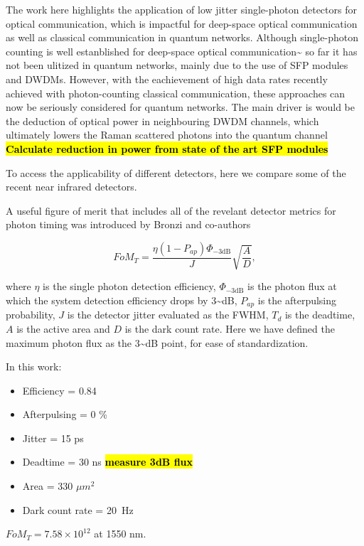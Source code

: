 \documentclass{optica-article}
\begin{document}
The work here highlights the application of low jitter single-photon detectors for optical communication, which is impactful for deep-space optical communication as well as classical communication in quantum networks. Although single-photon counting is well estanblished for deep-space optical communication\textasciitilde{}\cite{Laser lunar, DSOC} so far it has not been ulitized in quantum networks, mainly due to the use of SFP modules and DWDMs. However, with the eachievement of high data rates recently achieved with photon-counting classical communication, these approaches can now be seriously considered for quantum networks. The main driver is would be the deduction of optical power in neighbouring DWDM channels, which ultimately lowers the Raman scattered photons into the quantum channel \cite{EraerdsRaman}
\textbf{\hl{Calculate reduction in power from state of the art SFP modules}}

To access the applicability of different detectors, here we compare some of the recent near infrared detectors.

A useful figure of merit that includes all of the revelant detector metrics for photon timing was introduced by Bronzi and co-authors \cite{Bronzi2016}

$$FoM_T = \frac{\eta  (1 - P_{ap})\Phi_{-3 \text{dB}}}{J} \sqrt{\frac{A}{D}},$$

where $\eta$ is the single photon detection efficiency, $\Phi_{-3 \text{dB}}$ is the photon flux at which the system detection efficiency drops by 3\textasciitilde dB, $P_{ap}$ is the afterpulsing probability, $J$ is the detector jitter evaluated as the FWHM, $T_d$ is the deadtime, $A$ is the active area and $D$ is the dark count rate. Here we have defined the maximum photon flux as the 3\textasciitilde dB point, for ease of standardization.

In this work:

\begin{itemize}
\tightlist
\item
  Efficiency = 0.84
\item
  Afterpulsing = 0 \%
\item
  Jitter = 15 ps
\item
  Deadtime = 30 ns \textbf{\hl{measure 3dB flux}}
\item
  Area = 330 $\mu m^2$
\item
  Dark count rate = 20~Hz
\end{itemize}

$FoM_T = 7.58 \times 10^{12}$ at 1550 nm.
\end{document}
